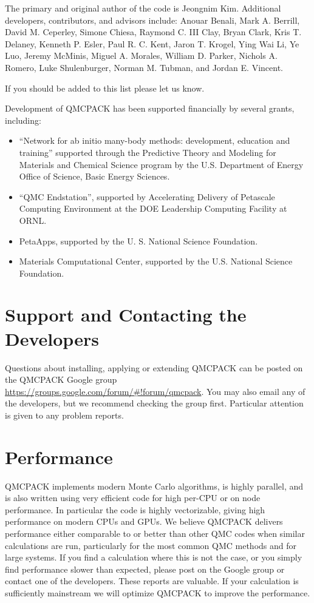 The primary and original author of the code is Jeongnim
Kim. Additional developers, contributors, and advisors include:
Anouar Benali,
Mark A. Berrill,  
David M. Ceperley, 
Simone Chiesa,
Raymond C. III Clay,
Bryan Clark,
Kris T. Delaney,
Kenneth P. Esler,
Paul R. C. Kent,
Jaron T. Krogel,
Ying Wai Li,
Ye Luo,
Jeremy McMinis,
Miguel A. Morales,
William D. Parker,
Nichols A. Romero,
Luke Shulenburger,
Norman M. Tubman,
and Jordan E. Vincent.

If you should be added to this list please let us know.

Development of QMCPACK has been supported financially by
several grants, including:

\begin{itemize}
\item ``Network for ab initio many-body methods: development, education
  and training'' supported through the Predictive
  Theory and Modeling for Materials and Chemical Science program by
  the U.S. Department of Energy Office of Science, Basic Energy
  Sciences.
\item ``QMC Endstation'', supported by Accelerating Delivery of Petascale
  Computing Environment at the DOE Leadership Computing Facility at
  ORNL.
\item PetaApps, supported by the U. S. National Science
  Foundation.
\item Materials Computational Center, supported by the
  U.S. National Science Foundation.
\end{itemize}


\section{Support and Contacting the Developers}
\label{sec:support}

Questions about installing, applying or extending QMCPACK can be
posted on the QMCPACK Google group
\url{https://groups.google.com/forum/#!forum/qmcpack}. You may also
email any of the developers, but we recommend checking the group
first. Particular attention is given to any problem reports.

\section{Performance}
\label{sec:performance}

QMCPACK implements modern Monte Carlo algorithms, is highly parallel,
and is also written using very efficient code for high per-CPU or on
node performance. In particular the code is highly vectorizable,
giving high performance on modern CPUs and GPUs. We believe QMCPACK
delivers performance either comparable to or better than other QMC
codes when similar calculations are run, particularly for the most
common QMC methods and for large systems. If you find a calculation where this is not the
case, or you simply find performance slower than expected, please post on the Google
group or contact one of the developers. These reports are valuable. If your calculation is
sufficiently mainstream we will optimize QMCPACK to improve
the performance.

